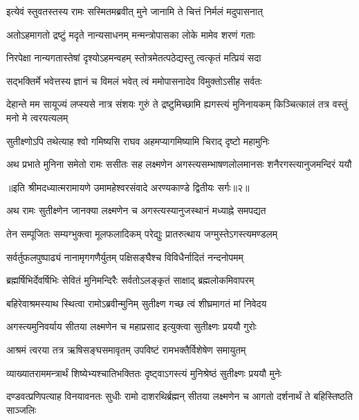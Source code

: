 \twolineshloka
{इत्येवं स्तुवतस्तस्य रामः सस्मितमब्रवीत्}
{मुने जानामि ते चित्तं निर्मलं मदुपासनात्} %

\twolineshloka
{अतोऽहमागतो द्रष्टुं मदृते नान्यसाधनम्}
{मन्मन्त्रोपासका लोके मामेव शरणं गताः} %

\twolineshloka
{निरपेक्षा नान्यगतास्तेषां दृश्योऽहमन्वहम्}
{स्तोत्रमेतत्पठेद्यस्तु त्वत्कृतं मत्प्रियं सदा} %

\twolineshloka
{सद्भक्तिर्मे भवेत्तस्य ज्ञानं च विमलं भवेत्}
{त्वं ममोपासनादेव विमुक्तोऽसीह सर्वतः} %

\threelineshloka
{देहान्ते मम सायूज्यं लप्स्यसे नात्र संशयः}
{गुरुं ते द्रष्टुमिच्छामि ह्यगस्त्यं मुनिनायकम्}
{किञ्चित्कालं तत्र वस्तुं मनो मे त्वरयत्यलम्} %

\twolineshloka
{सुतीक्ष्णोऽपि तथेत्याह श्वो गमिष्यसि राघव}
{अहमप्यागमिष्यामि चिराद् दृष्टो महामुनिः} %

\fourlineindentedshloka
{अथ प्रभाते मुनिना समेतो}
{रामः ससीतः सह लक्ष्मणेन}
{अगस्त्यसम्भाषणलोलमानसः}
{शनैरगस्त्यानुजमन्दिरं ययौ} %

{॥इति श्रीमदध्यात्मरामायणे उमामहेश्वरसंवादे
अरण्यकाण्डे द्वितीयः सर्गः॥२॥
}




\twolineshloka
{अथ रामः सुतीक्ष्णेन जानक्या लक्ष्मणेन च}
{अगस्त्यस्यानुजस्थानं मध्याह्ने समपद्यत} %

\twolineshloka
{तेन सम्पूजितः सम्यग्भुक्त्वा मूलफलादिकम्}
{परेद्युः प्रातरुत्थाय जग्मुस्तेऽगस्त्यमण्डलम्} %

\twolineshloka
{सर्वर्तुफलपुष्पाढ्यं नानामृगगणैर्युतम्}
{पक्षिसङ्घैश्च विविधैर्नादितं नन्दनोपमम्} %

\twolineshloka
{ब्रह्मर्षिभिर्देवर्षिभिः सेवितं मुनिमन्दिरैः}
{सर्वतोऽलङ्कृतं साक्षाद् ब्रह्मलोकमिवापरम्} %

\twolineshloka
{बहिरेवाश्रमस्याथ स्थित्वा रामोऽब्रवीन्मुनिम्}
{सुतीक्ष्ण गच्छ त्वं शीघ्रमागतं मां निवेदय} %

\twolineshloka
{अगस्त्यमुनिवर्याय सीतया लक्ष्मणेन च}
{महाप्रसाद इत्युक्त्वा सुतीक्ष्णः प्रययौ गुरोः} %

\twolineshloka
{आश्रमं त्वरया तत्र ऋषिसङ्घसमावृतम्}
{उपविष्टं रामभक्तैर्विशेषेण समायुतम्} %

\twolineshloka
{व्याख्यातराममन्त्रार्थं शिष्येभ्यश्चातिभक्तितः}
{दृष्ट्वाऽगस्त्यं मुनिश्रेष्ठं सुतीक्ष्णः प्रययौ मुनेः} %

\threelineshloka
{दण्डवत्प्रणिपत्याह विनयावनतः सुधीः}
{रामो दाशरथिर्ब्रह्मन् सीतया लक्ष्मणेन च}
{आगतो दर्शनार्थं ते बहिस्तिष्ठति साञ्जलिः} %

